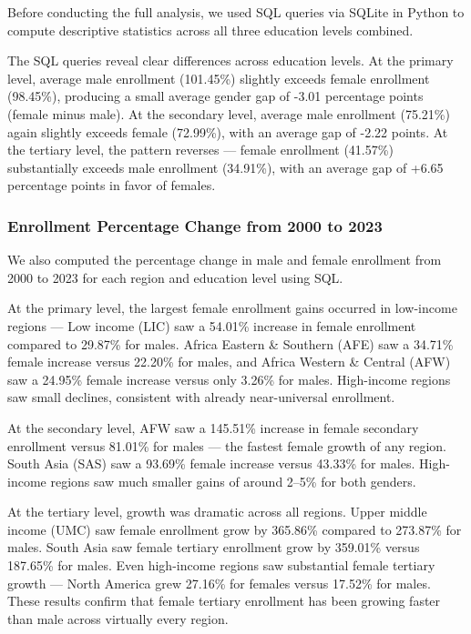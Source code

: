 \documentclass[
  11pt,
]{article}
\begin{document}
Before conducting the full analysis, we used SQL queries via SQLite in
Python to compute descriptive statistics across all three education
levels combined.

The SQL queries reveal clear differences across education levels. At the
primary level, average male enrollment (101.45\%) slightly exceeds
female enrollment (98.45\%), producing a small average gender gap of
-3.01 percentage points (female minus male). At the secondary level,
average male enrollment (75.21\%) again slightly exceeds female
(72.99\%), with an average gap of -2.22 points. At the tertiary level,
the pattern reverses --- female enrollment (41.57\%) substantially
exceeds male enrollment (34.91\%), with an average gap of +6.65
percentage points in favor of females.

\subsubsection{Enrollment Percentage Change from 2000 to
2023}\label{enrollment-percentage-change-from-2000-to-2023}

We also computed the percentage change in male and female enrollment
from 2000 to 2023 for each region and education level using SQL.

At the primary level, the largest female enrollment gains occurred in
low-income regions --- Low income (LIC) saw a 54.01\% increase in female
enrollment compared to 29.87\% for males. Africa Eastern \& Southern
(AFE) saw a 34.71\% female increase versus 22.20\% for males, and Africa
Western \& Central (AFW) saw a 24.95\% female increase versus only
3.26\% for males. High-income regions saw small declines, consistent
with already near-universal enrollment.

At the secondary level, AFW saw a 145.51\% increase in female secondary
enrollment versus 81.01\% for males --- the fastest female growth of any
region. South Asia (SAS) saw a 93.69\% female increase versus 43.33\%
for males. High-income regions saw much smaller gains of around 2--5\%
for both genders.

At the tertiary level, growth was dramatic across all regions. Upper
middle income (UMC) saw female enrollment grow by 365.86\% compared to
273.87\% for males. South Asia saw female tertiary enrollment grow by
359.01\% versus 187.65\% for males. Even high-income regions saw
substantial female tertiary growth --- North America grew 27.16\% for
females versus 17.52\% for males. These results confirm that female
tertiary enrollment has been growing faster than male across virtually
every region.
\end{document}
